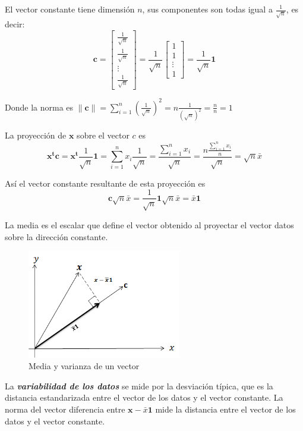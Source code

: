 \documentclass[12pt,letterpaper]{report} %
\begin{document}
El vector constante tiene dimensión $n$, sus componentes son todas igual a $\frac{1}{\sqrt{n}}$, es decir:
$$\mathbf{c}=\begin{bmatrix} \frac{1}{\sqrt{n}} \\ \frac{1}{\sqrt{n}} \\ \vdots \\ \frac{1}{\sqrt{n}} \end{bmatrix}=\frac{1}{\sqrt{n}}\begin{bmatrix} 1 \\ 1 \\ \vdots \\ 1 \end{bmatrix}=\frac{1}{\sqrt{n}}\mathbf{1}$$

Donde la norma es $\left\| \mathbf{c} \right\| = \sum_{i=1}^n \left( \frac{1}{\sqrt{n}} \right)^2 = n\frac{1}{(\sqrt{n})^2}=\frac{n}{n}=1$

La proyección de $\mathbf{x}$ sobre el vector $c$ es 
$$\mathbf{x^tc}=\mathbf{x^t}\frac{1}{\sqrt{n}} \mathbf{1}=\sum_{i=1}^n x_i \frac{1}{\sqrt{n}}=\frac{\sum_{i=1}^n x_i}{\sqrt{n}}=\frac{n\frac{\sum_{i=1}^n x_i}{n}}{\sqrt{n}}=\sqrt{n}\bar x$$

Así el vector constante resultante de esta proyección es 
$$\mathbf{c}\sqrt{n}\bar x= \frac{1}{\sqrt{n}}\mathbf{1}\sqrt{n}\bar x=\bar x \mathbf{1}$$

La media es el escalar que define el vector obtenido al proyectar el vector datos sobre la dirección constante. 

\begin{figure}
	\caption{Media y varianza de un vector}
	\centering
	\includegraphics[width=0.6\textwidth]{img/proymed.png}
\end{figure}

La \textit{\textbf{variabilidad de los datos}} se mide por la desviación típica, que es la distancia estandarizada entre el vector de los datos y el vector constante. La norma del vector diferencia entre $\mathbf{x}-\bar x \mathbf{1}$ mide la distancia entre el vector de los datos y el vector constante.
\end{document}
